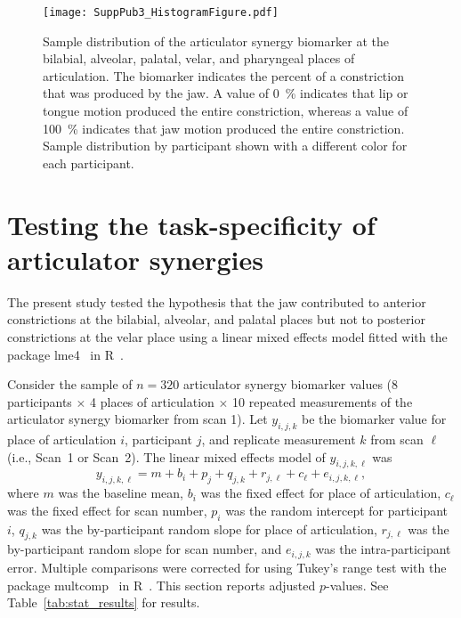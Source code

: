\documentclass[reprint]{JASAnew}\usepackage[]{graphicx}\usepackage[]{color}
\begin{document}
\begin{figure*}

\texttt{[image: SuppPub3\_HistogramFigure.pdf]}

\caption{\label{fig:histograms}
Sample distribution of the articulator synergy biomarker at the bilabial, alveolar, palatal, velar, and pharyngeal places of articulation. The biomarker indicates the percent of a constriction that was produced by the jaw.
A value of \SI{0}{\percent} indicates that lip or tongue motion produced the entire constriction, whereas a value of \SI{100}{\percent} indicates that jaw motion produced the entire constriction. 
Sample distribution by participant shown with a different color for each participant.}

\end{figure*}











\section{Testing the task-specificity of articulator synergies}
\label{sec:taskdependence}

The present study tested the hypothesis that the jaw contributed to anterior constrictions at the bilabial, alveolar, and palatal places but not to posterior constrictions at the velar place using a linear mixed effects model fitted with the package lme4~\citep{bates2015fitting} in R~\citep{r2017language}. 


Consider the sample of $n=320$ articulator synergy biomarker values (\num{8} participants $\times$ \num{4} places of articulation $\times$ \num{10} repeated measurements of the articulator synergy biomarker from scan \num{1}). Let $y_{i,j,k}$ be the biomarker value for place of articulation $i$, participant $j$, and replicate measurement $k$ from scan $\ell$ (i.e., Scan~\num{1} or Scan~\num{2}). The linear mixed effects model of $y_{i,j,k,\ell}$ was 
%
\begin{equation}
y_{i,j,k,\ell} = m + b_i + p_j + q_{j,k} + r_{j,\ell} + c_\ell + e_{i,j,k,\ell},
\end{equation}
%
where $m$ was the baseline mean, $b_i$ was the fixed effect for place of articulation, $c_\ell$ was the fixed effect for scan number, $p_i$ was the random intercept for participant $i$, $q_{j,k}$ was the by-participant random slope for place of articulation, $r_{j,\ell}$ was the by-participant random slope for scan number, and $e_{i,j,k}$ was the intra-participant error. Multiple comparisons were corrected for using Tukey's range test with the package multcomp~\citep{hothorn2008simultaneous} in R~\citep{r2017language}. This section reports adjusted $p$-values. See Table~\ref{tab:stat_results} for results.
\end{document}
